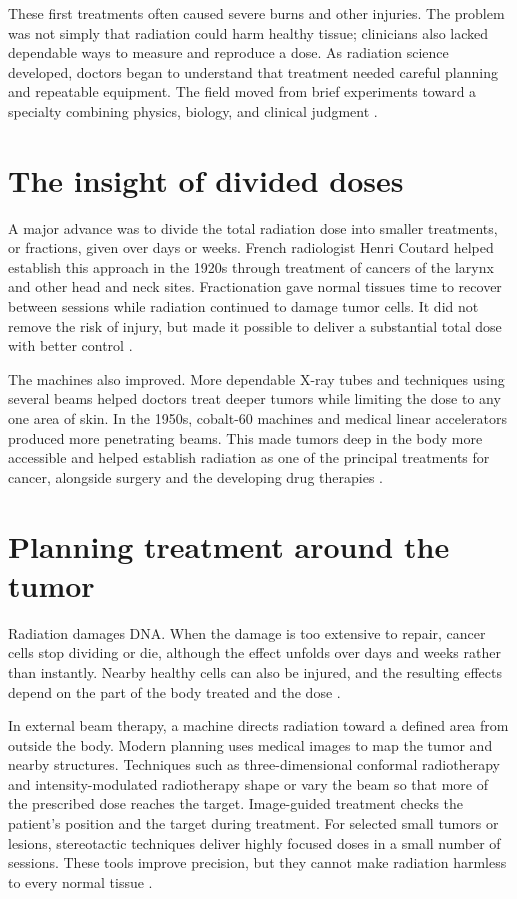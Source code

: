 \documentclass[12pt,oneside]{book}
\begin{document}
These first treatments often caused severe burns and other injuries. The
problem was not simply that radiation could harm healthy tissue; clinicians
also lacked dependable ways to measure and reproduce a dose. As radiation
science developed, doctors began to understand that treatment needed careful
planning and repeatable equipment. The field moved from brief experiments
toward a specialty combining physics, biology, and clinical judgment
\cite{connellRadiotherapyHistory}.

\section{The insight of divided doses}
A major advance was to divide the total radiation dose into smaller
treatments, or fractions, given over days or weeks. French radiologist
Henri Coutard helped establish this approach in the 1920s through treatment
of cancers of the larynx and other head and neck sites. Fractionation gave
normal tissues time to recover between sessions while radiation continued
to damage tumor cells. It did not remove the risk of injury, but made it
possible to deliver a substantial total dose with better control
\cite{connellRadiotherapyHistory}.

The machines also improved. More dependable X-ray tubes and techniques using
several beams helped doctors treat deeper tumors while limiting the dose to
any one area of skin. In the 1950s, cobalt-60 machines and medical linear
accelerators produced more penetrating beams. This made tumors deep in the
body more accessible and helped establish radiation as one of the principal
treatments for cancer, alongside surgery and the developing drug therapies
\cite{connellRadiotherapyHistory}.

\section{Planning treatment around the tumor}
Radiation damages DNA. When the damage is too extensive to repair, cancer
cells stop dividing or die, although the effect unfolds over days and weeks
rather than instantly. Nearby healthy cells can also be injured, and the
resulting effects depend on the part of the body treated and the dose
\cite{nciRadiationTherapy}.

In external beam therapy, a machine directs radiation toward a defined area
from outside the body. Modern planning uses medical images to map the tumor
and nearby structures. Techniques such as three-dimensional conformal
radiotherapy and intensity-modulated radiotherapy shape or vary the beam so
that more of the prescribed dose reaches the target. Image-guided treatment
checks the patient's position and the target during treatment. For selected
small tumors or lesions, stereotactic techniques deliver highly focused
doses in a small number of sessions. These tools improve precision, but
they cannot make radiation harmless to every normal tissue
\cite{nciRadiationTherapy,connellRadiotherapyHistory}.
\end{document}
